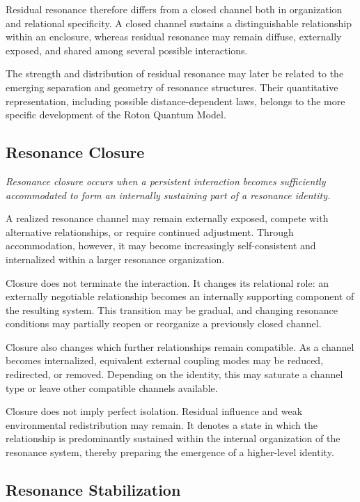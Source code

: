\documentclass[11pt,a4paper]{article}
\begin{document}
Residual resonance therefore differs from a closed channel both in organization and relational specificity. A closed channel sustains a distinguishable relationship within an enclosure, whereas residual resonance may remain diffuse, externally exposed, and shared among several possible interactions.

The strength and distribution of residual resonance may later be related to the emerging separation and geometry of resonance structures. Their quantitative representation, including possible distance-dependent laws, belongs to the more specific development of the Roton Quantum Model.

\subsection{Resonance Closure}

\emph{Resonance closure occurs when a persistent interaction becomes sufficiently accommodated to form an internally sustaining part of a resonance identity.}
\vspace{0.6em}

A realized resonance channel may remain externally exposed, compete with alternative relationships, or require continued adjustment. Through accommodation, however, it may become increasingly self-consistent and internalized within a larger resonance organization.

Closure does not terminate the interaction. It changes its relational role: an externally negotiable relationship becomes an internally supporting component of the resulting system. This transition may be gradual, and changing resonance conditions may partially reopen or reorganize a previously closed channel.

Closure also changes which further relationships remain compatible. As a channel becomes internalized, equivalent external coupling modes may be reduced, redirected, or removed. Depending on the identity, this may saturate a channel type or leave other compatible channels available.

Closure does not imply perfect isolation. Residual influence and weak environmental redistribution may remain. It denotes a state in which the relationship is predominantly sustained within the internal organization of the resonance system, thereby preparing the emergence of a higher-level identity.

\subsection{Resonance Stabilization}
\end{document}
